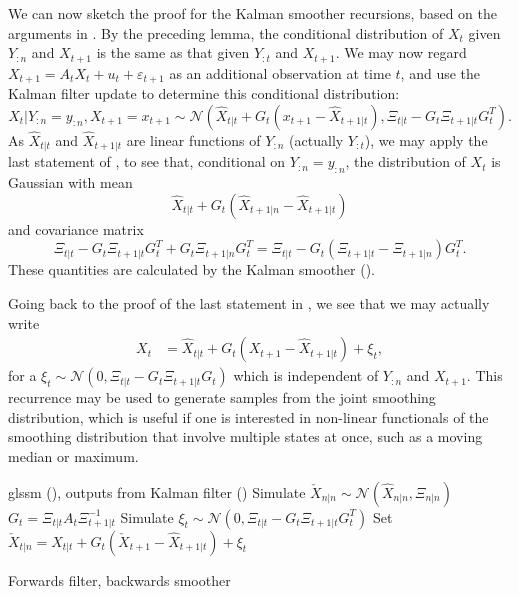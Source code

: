 We can now sketch the proof for the Kalman smoother recursions, based on the arguments in \citep[Chapter 7.3]{Chopin2020Introduction}. By the preceding lemma, the conditional distribution of $X_{t}$ given $Y_{:n}$ and $X_{t + 1}$ is the same as that given $Y_{:t}$ and $X_{t + 1}$. 
We may now regard $X_{t + 1} = A_{t}X_{t} + u_{t} + \varepsilon_{t + 1}$ as an additional observation at time $t$, and use the Kalman filter update to determine this conditional distribution:
$$
X_{t} | Y_{:n} = y_{:n}, X_{t + 1} = x_{t+1}\sim \mathcal N \left(\hat X_{t|t} + G_{t}(x_{t + 1} - \hat X_{t + 1 | t}), \Xi_{t |t} - G_{t} \Xi_{t + 1 | t} G_{t}^{T} \right).
$$
As $\hat X_{t|t}$ and $\hat X_{t+1|t}$ are linear functions of $Y_{:n}$ (actually $Y_{:t}$), we may apply the last statement of , to see that, conditional on $Y_{:n} = y_{:n}$, the distribution of $X_{t}$ is Gaussian with mean
$$
\hat X_{t|t} + G_{t} \left( \hat X_{t + 1 | n} - \hat X_{t + 1 | t} \right)
$$
and covariance matrix 
$$
\Xi_{t | t} - G_{t} \Xi_{t + 1|t} G_{t}^{T} + G_{t} \Xi_{t + 1 | n} G_{t}^{T} = \Xi_{t|t} - G_{t} \left( \Xi_{t + 1 | t} - \Xi_{t + 1 | n} \right)G_{t} ^{T}.
$$
These quantities are calculated by the Kalman smoother ().

Going back to the proof of the last statement in , we see that we may actually write
\begin{align}
    \label{eq:kalman-smoother-backwards-recursion}
    X_{t} &= \hat X_{t|t} + G_{t}(X_{t + 1} - \hat X_{t + 1 | t}) + \xi_{t},
\end{align}
for a $\xi_{t} \sim \mathcal N \left( 0, \Xi_{t | t} - G_{t} \Xi_{t + 1|t}G_{t} \right)$ which is independent of $Y_{:n}$ and $X_{t + 1}$.
This recurrence may be used to generate samples from the joint smoothing distribution, which is useful if one is interested in non-linear functionals of the smoothing distribution that involve multiple states at once, such as a moving median or maximum. 
\begin{algorithm}
    \begin{algorithmic}
        \Require \acrshort{glssm} (), outputs from Kalman filter ()
        \State Simulate $\check X_{n|n} \sim \mathcal N(\hat X_{n|n}, \Xi_{n|n})$
            \State $G_{t} = \Xi_{t|t}A_{t}\Xi^{-1}_{t + 1 | t}$
            \State Simulate $\xi_{t} \sim \mathcal N(0, \Xi_{t|t} - G_{t}\Xi_{t+1|t}G^{T}_t)$
            \State Set $\check X_{t|n} = \hat X_{t|t} + G_{t} \left( \check X_{t + 1} - \hat X_{t + 1| t} \right) + \xi_{t}$
        \EndFor
    \end{algorithmic}
    \caption{Forwards filter, backwards smoother \citep[Proposition 1]{Fruhwirth-Schnatter1994Data}} \label{alg:ffbs}
\end{algorithm}

